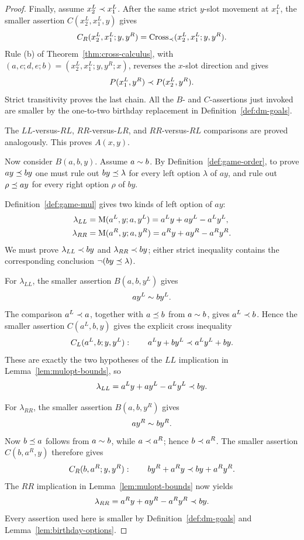 \begin{proof}
  Finally, assume \(x^L_2\prec x^L_1\).  After the same strict
  \(y\)-slot movement at \(x^L_1\), the smaller assertion
  \(C(x^L_2,x^L_1,y)\) gives
  \[
    C_R(x^L_2,x^L_1;y,y^R)
      =\operatorname{Cross}_{\prec}(x^L_2,x^L_1;y,y^R).
  \]
  Rule \textup{(b)} of Theorem~\ref{thm:cross-calculus},
  with \((a,c;d,e;b)=(x^L_2,x^L_1;y,y^R;x)\), reverses the \(x\)-slot
  direction and gives
  \[
    P(x^L_1,y^R)\prec P(x^L_2,y^R).
  \]
  Strict transitivity proves the last chain.  All the \(B\)- and
  \(C\)-assertions just invoked are smaller by the one-to-two birthday
  replacement in Definition~\ref{def:dm-goals}.

  The \(LL\)-versus-\(RL\), \(RR\)-versus-\(LR\), and
  \(RR\)-versus-\(RL\) comparisons are proved analogously.  This proves
  \(A(x,y)\).

  Now consider \(B(a,b,y)\).  Assume \(a\sim b\).  By
  Definition~\ref{def:game-order}, to prove \(ay\preceq by\) one must rule out
  \(by\preceq\lambda\) for every left option \(\lambda\) of \(ay\), and rule
  out \(\rho\preceq ay\) for every right option \(\rho\) of \(by\).

  Definition~\ref{def:game-mul} gives two kinds of left option of \(ay\):
  \[
    \begin{aligned}
      \lambda_{LL}&=\operatorname{M}(a^L,y;a,y^L)
        =a^Ly+ay^L-a^Ly^L,\\
      \lambda_{RR}&=\operatorname{M}(a^R,y;a,y^R)
        =a^Ry+ay^R-a^Ry^R.
    \end{aligned}
  \]
  We must prove \(\lambda_{LL}\prec by\) and
  \(\lambda_{RR}\prec by\); either strict inequality contains the
  corresponding conclusion \(\neg(by\preceq\lambda)\).

  For \(\lambda_{LL}\), the smaller assertion \(B(a,b,y^L)\) gives
  \[
    ay^L\sim by^L.
  \]
  The comparison \(a^L\prec a\), together with \(a\preceq b\) from
  \(a\sim b\), gives \(a^L\prec b\).  Hence the smaller assertion
  \(C(a^L,b,y)\) gives the explicit cross inequality
  \[
    C_L(a^L,b;y,y^L):\qquad
    a^Ly+by^L\prec a^Ly^L+by.
  \]
  These are exactly the two hypotheses of the \(LL\) implication in
  Lemma~\ref{lem:mulopt-bounds}, so
  \[
    \lambda_{LL}=a^Ly+ay^L-a^Ly^L\prec by.
  \]

  For \(\lambda_{RR}\), the smaller assertion \(B(a,b,y^R)\) gives
  \[
    ay^R\sim by^R.
  \]
  Now \(b\preceq a\) follows from \(a\sim b\), while
  \(a\prec a^R\); hence \(b\prec a^R\).  The smaller assertion
  \(C(b,a^R,y)\) therefore gives
  \[
    C_R(b,a^R;y,y^R):\qquad
    by^R+a^Ry\prec by+a^Ry^R.
  \]
  The \(RR\) implication in Lemma~\ref{lem:mulopt-bounds} now yields
  \[
    \lambda_{RR}=a^Ry+ay^R-a^Ry^R\prec by.
  \]
  Every assertion used here is smaller by Definition~\ref{def:dm-goals} and
  Lemma~\ref{lem:birthday-options}.


\end{proof}
